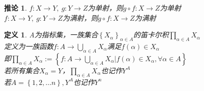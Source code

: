 \documentclass[12pt, a4paper, oneside]{ctexbook}
\newtheorem{definition}[theorem]{定义}
\newtheorem{corollary}[theorem]{推论}
\begin{document}
\begin{corollary}
    $f:X\rightarrow Y,\ g:Y\rightarrow Z$为单射，则$g\circ f:X\rightarrow Z$为单射\\
    $f:X\rightarrow Y,\ g:Y\rightarrow Z$为满射，则$g\circ f:X\rightarrow Z$为满射
\end{corollary}
\begin{definition}
    A为指标集，一族集合$\left\{X_{\alpha}\right\}_{\alpha\in A}$的笛卡尔积$\prod_{\alpha\in A}X_{\alpha}$\\
    定义为一族函数$f:A\rightarrow\bigcup_{\alpha\in A}X_{\alpha}$满足$f(\alpha)\in X_{\alpha}$\\
    即$\prod_{\alpha\in A}X_{\alpha}:=\left\{f:A\rightarrow\bigcup_{\alpha\in A}X_{\alpha}|f(\alpha)\in X_{\alpha},\forall \alpha\in A\right\}$\\
    若所有集合$X_{\alpha}=Y$，$\prod_{\alpha\in A}X_{\alpha}$也记作$Y^{A}$\\
    若$A=\left\{1,2,\dots n\right\},Y^{A}$也记作$Y^{n}$
\end{definition}
\end{document}
